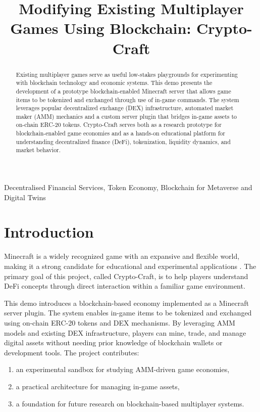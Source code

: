 \documentclass[conference]{IEEEtran}
\begin{document}
\title{Modifying Existing Multiplayer Games Using Blockchain: Crypto-Craft}
\author{
}

\maketitle

\begin{abstract}
Existing multiplayer games serve as useful low-stakes playgrounds for experimenting with blockchain technology and economic systems. This demo presents the development of a prototype blockchain-enabled Minecraft server that allows game items to be tokenized and exchanged through use of in-game commands. The system leverages popular decentralized exchange (DEX) infrastructure, automated market maker (AMM) mechanics and a custom server plugin that bridges in-game assets to on-chain ERC-20 tokens. Crypto-Craft serves both as a research prototype for blockchain-enabled game economies and as a hands-on educational platform for understanding decentralized finance (DeFi), tokenization, liquidity dynamics, and market behavior.
\end{abstract}

\begin{IEEEkeywords}
Decentralised Financial Services,
Token Economy,
Blockchain for Metaverse and Digital Twins
\end{IEEEkeywords}

\section{Introduction}
Minecraft is a widely recognized game with an expansive and flexible world, making it a strong candidate for educational and experimental applications \cite{unisa2025minecraft}. 
The primary goal of this project, called Crypto-Craft, is to help players understand DeFi concepts through direct interaction within a familiar game environment.

This demo introduces a blockchain-based economy implemented as a Minecraft server plugin. The system enables in-game items to be tokenized and exchanged using on-chain ERC-20 tokens and DEX mechanisms. 
By leveraging AMM models and existing DEX infrastructure, players can mine, trade, and manage digital assets without needing prior knowledge of blockchain wallets or development tools.
The project contributes:
\begin{enumerate}
\item an experimental sandbox for studying AMM-driven game economies,
\item a practical architecture for managing in-game assets,
\item a foundation for future research on blockchain-based multiplayer systems.
\end{enumerate}
\end{document}
